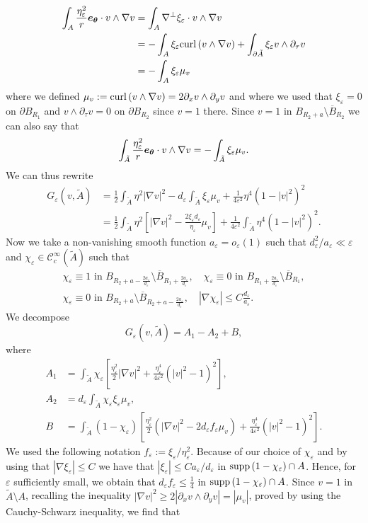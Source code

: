 \documentclass[12pt,reqno]{amsart}
\def\A{{\tilde{A}}}
\def\C{{\mathcal C}}
\def\e {{\varepsilon}}
\renewcommand{\vec}[1]{\text{\boldmath $#1$}}
\def\curl{{\rm curl\,}}
\def\supp{{\rm supp\,}}
\def \p {\partial}
\numberwithin{equation}{section}
\begin{document}
\begin{align*}
\int_{A} \frac{\eta_\e^2}{r}\vec{e_\theta}\cdot v\wedge \nabla v &=\int_{A} \nabla^\perp \xi_\e \cdot v\wedge \nabla v \\
&= -\int_{A}\xi_\e \curl (v\wedge \nabla v)+\int_{\p \A} \xi_\e v\wedge \p_\tau v \\
&= -\int_{A}\xi_\e \mu_v
\end{align*}
where we defined \(\mu_v:= \curl (v\wedge \nabla v)=2\p_xv\wedge\p_yv\) and where we used that \(\xi_\e=0\) on \(\p B_{R_1}\) and \(v\wedge \p_\tau v=0\) on \(\p B_{R_2}\) since \(v=1\) there. Since \(v=1\) in \(B_{R_2+a}\setminus \overline{B}_{R_2}\) we can also say that
\begin{equation*}
\int_{\A} \frac{\eta_\e^2}{r}\vec{e_\theta}\cdot v\wedge \nabla v =-\int_{\A}\xi_\e \mu_v.
\end{equation*}
We can thus rewrite 
\begin{align*}
G_\e(v,\A)&=\frac12 \int_{\A}\eta^2|\nabla v|^2-d_\e \int_{\A}\xi_\e \mu_v+\frac{1}{4\e^2}\eta^4 (1-|v|^2)^2 \\
&=\frac12 \int_{\A}\eta^2\left[|\nabla v|^2-\frac{2\xi_\e d_\e}{\eta_\e}\mu_v\right]+\frac{1}{4\e^2}\int_{\A}\eta^4(1-|v|^2)^2.
\end{align*}
Now we take a non-vanishing smooth function \(a_\e=o_\e(1)\) such that \(d_\e^2/a_\e \ll \e\) and \(\chi_\e\in \C^\infty_c(\A)\) such that 
\begin{multline*}
\chi_\e \equiv 1 \text{ in } B_{R_2+a-\frac{2a_\e}{d_\e}}\setminus \overline{B}_{R_1+\frac{2a_\e}{d_\e}}, \quad \chi_\e\equiv 0 \text{ in } B_{R_1+\frac{2a_\e}{d_\e}}\setminus \overline{B}_{R_1}, \\
 \chi_\e\equiv 0 \text{ in }  B_{R_2+a}\setminus \overline{B}_{R_2+a-\frac{2a_\e}{d_\e}}, \quad |\nabla \chi_\e|\leq C\frac{d_\e}{a_\e}.
\end{multline*}
We decompose
\begin{equation*}
G_\e(v,\A)= A_1-A_2+B,
\end{equation*}
where
\begin{align*}
A_1&=\int_{\A} \chi_\e \left[\frac{\eta_\e^2}{2}|\nabla v|^2+\frac{\eta_\e^4}{4\e^2}(|v|^2-1)^2 \right], \\
A_2&= d_\e \int_{\A} \chi_\e \xi_\e \mu_v, \\
B&=\int_{\A} (1-\chi_\e ) \left[ \frac{\eta_\e^2}{2}(|\nabla v|^2-2 d_\e f_\e \mu_v) +\frac{\eta_\e^4}{4\e^2}(|v|^2-1)^2 \right].
\end{align*}
We used the following notation \(f_\e:=\xi_\e/\eta_\e^2\). Because of our choice of \(\chi_\e\) and by using that \(|\nabla \xi_\e|\leq C\) we have that \(|\xi_\e|\leq C a_\e/d_\e\) in \(\supp(1-\chi_\e)\cap A\). Hence, for \(\e\) sufficiently small, we obtain that \(d_\e f_\e\leq \frac{1}{4}\) in \(\supp(1-\chi_\e)\cap A\). Since \(v=1\) in \(\A\setminus A\), recalling the inequality \(|\nabla v|^2 \geq 2 |\p_xv\wedge \p_yv|=|\mu_v|\), proved by using the Cauchy-Schwarz inequality, we find that 
\end{document}
